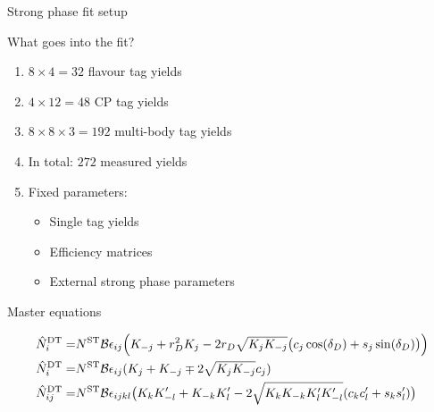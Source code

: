 \documentclass{beamer}
\begin{document}
\begin{frame}{Strong phase fit setup}
  \begin{center}
    \Large{What goes into the fit?}
  \end{center}
  \vspace{0.2cm}
  \begin{enumerate}
    \item{$8\times4 = 32$ flavour tag yields}
    \item{$4\times12 = 48$ CP tag yields}
    \item{$8\times8\times3 = 192$ multi-body tag yields}
    \item{In total: $272$ measured yields}
    \item{Fixed parameters:}
    \begin{itemize}
      \item{Single tag yields}
      \item{Efficiency matrices}
      \item{External strong phase parameters}
    \end{itemize}
  \end{enumerate}
  \begin{block}{Master equations}
    \begin{center}
      \vspace{-0.5cm}
      \begin{align*}
        \hat{N}^{\rm DT}_i =& N^{\rm ST}\mathcal{B}\epsilon_{ij}\Big(K_{-j} + r_D^2K_j - 2r_D\sqrt{K_jK_{-j}}\big(c_j\cos(\delta_D) + s_j\sin(\delta_D)\big)\Big) \\
        \hat{N}^{\rm DT}_i =& N^{\rm ST}\mathcal{B}\epsilon_{ij}(K_j + K_{-j} \mp 2\sqrt{K_jK_{-j}}c_j) \\
        \hat{N}^{\rm DT}_{ij} =& N^{\rm ST}\mathcal{B}\epsilon_{ijkl}\big(K_{k}K_{-l}^\prime + K_{-k}K_{l}^\prime - 2\sqrt{K_{k}K_{-k}K_{l}^\prime K_{-l}^\prime}(c_{k}c_{l}^\prime + s_{k}s_{l}^\prime)\big)
      \end{align*}
    \end{center}
  \end{block}
\end{frame}
\end{document}
